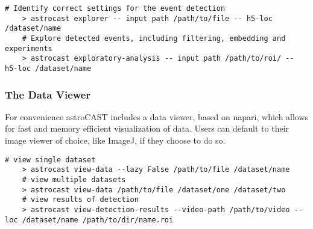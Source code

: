 \begin{lstlisting}[style=bashStyle]
    # Identify correct settings for the event detection
    > astrocast explorer -- input path /path/to/file -- h5-loc /dataset/name
    # Explore detected events, including filtering, embedding and experiments
    > astrocast exploratory-analysis -- input path /path/to/roi/ -- h5-loc /dataset/name
\end{lstlisting}

\subsubsection{The Data Viewer}

For convenience astroCAST includes a data viewer, based on napari\citep{sofroniew_nicholas_napari_2022}, which allows for fast and memory efficient visualization of data. Users can default to their image viewer of choice, like ImageJ, if they choose to do so.

\begin{lstlisting}[style=bashStyle]
    # view single dataset
    > astrocast view-data --lazy False /path/to/file /dataset/name
    # view multiple datasets
    > astrocast view-data /path/to/file /dataset/one /dataset/two
    # view results of detection
    > astrocast view-detection-results --video-path /path/to/video --loc /dataset/name /path/to/dir/name.roi
\end{lstlisting}
